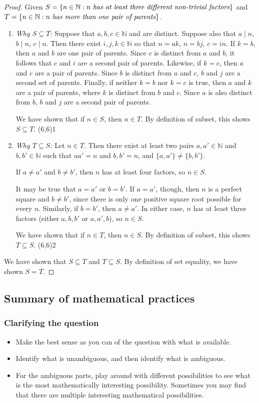 \documentclass[11pt]{article}
\newcommand\tn{\textnormal}
\newcommand{\N}{\mathbb{N}}
\renewcommand\subset\subseteq
\newcommand\st{:}
\theoremstyle{definition}
\newcommand\qedpart[1]{ \hfill \framebox(6,6){\tiny #1}}
\begin{document}
\begin{proof}
Given $S=\{ n\in \N\st n\tn{ \it has at least three different non-trivial factors}\}$ and $T=\{ n\in \N \st n \tn{ \it has more than one pair of parents}\}$.
\begin{enumerate}
  \item {\it Why $S\subset T$:} Suppose that $a,b,c\in\mathbb{N}$ and are distinct. Suppose also that $a \mid n$, $b\mid n$, $c\mid n$. Then there exist 
    $i,j,k\in \mathbb{N}$ so that $n=ak$, $n=bj$, $c=in$. If $k=b$, then $a$ and $b$ are one pair of parents. Since $c$ is distinct from $a$ and $b$, it follows
    that $c$ and $i$ are a second pair of parents. Likewise, if $k = c$, then $a$ and $c$ are a pair of parents. Since $b$ is distinct from $a$ and $c$, $b$ and $j$ 
    are a second set of parents. Finally, if neither $k=b$ nor $k=c$ is true, then $a$ and $k$ are a pair of parents, where $k$ is distinct from $b$ and $c$.
    Since $a$ is also distinct from $b$, $b$ and $j$ are a second pair of parents.

    We have shown that if $n\in S$, then $n\in T$. By definition of subset, this shows $S\subset T$. \qedpart{1}

\item {\it Why $T\subset S$:} 
Let $n\in T$. Then there exist at least two pairs $a, a'\in \N$ and $b, b'\in \N$ such that $aa'=n$ and $b,b'=n$, and $\{a,a'\} \neq \{b, b'\}$.

If $a\neq a'$ and $b\neq b'$, then $n$ has at least four factors, so $n\in S$.

It may be true that $a=a'$ or $b=b'$. If $a=a'$, though, then $n$ is a perfect square and $b\neq b'$, since there is only one positive square root possible for every $n$. Similarly, if $b=b'$, then $a\neq a'$. In either case, $n$ has at least three factors (either $a, b, b'$ or $a, a', b$), so $n\in S$.

We have shown that if $n\in T$, then $n\in S$. By definition of subset, this shows $T\subset S$. \qedpart{2}
\end{enumerate}
We have shown that $S\subset T$ and $T\subset S$. By definition of set equality, we have shown $S=T$.
\end{proof}

\subsection{Summary of mathematical practices}
 
 
\subsubsection*{Clarifying the question}
 \begin{itemize}
 \item Make the best sense as you can of the question with what is available.
 \item Identify what is unambiguous, and then identify what is ambiguous.
 \item For the ambiguous parts, play around with different possibilities to see what is the most mathematically interesting possibility. Sometimes you may find that there are multiple interesting mathematical possibilities.
 \end{itemize}
\end{document}
